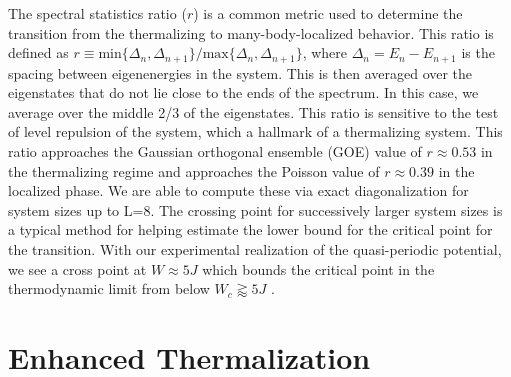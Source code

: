 The spectral statistics ratio ($r$) is a common metric used to determine the transition from the thermalizing to many-body-localized behavior. This ratio is defined as $r\equiv \mathrm{min} \{ \Delta_n , \Delta_{n+1} \} / \mathrm{max} \{ \Delta_n, \Delta_{n+1} \}$, where $\Delta_n = E_n - E_{n+1}$ is the spacing between eigenenergies in the system. This is then averaged over the eigenstates that do not lie close to the ends of the spectrum. In this case, we average over the middle 2/3 of the eigenstates. This ratio is sensitive to the test of level repulsion of the system, which a hallmark of a thermalizing system. This ratio approaches the Gaussian orthogonal ensemble (GOE) value of $r\approx 0.53$ in the thermalizing regime and approaches the Poisson value of $r\approx 0.39$ in the localized phase. We are able to compute these via exact diagonalization for system sizes up to L=8. The crossing point for successively larger system sizes is a typical method for helping estimate the lower bound for the critical point for the transition. With our experimental realization of the quasi-periodic potential, we see a cross point at $W\approx5J$ which bounds the critical point in the thermodynamic limit from below $W_c\gtrapprox 5J$ \cite{Khemani2017}.



\section{Enhanced Thermalization}

